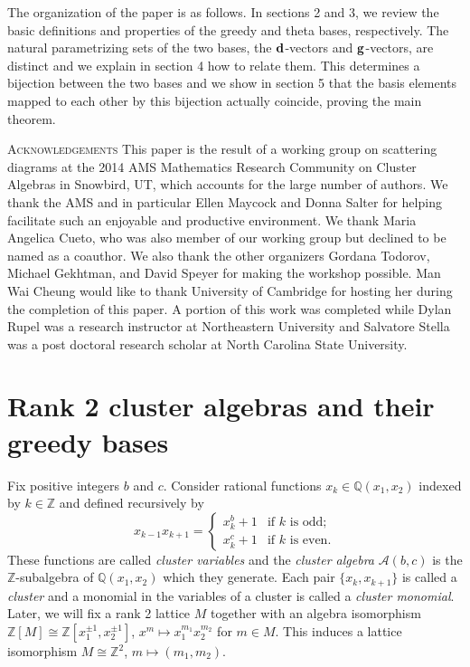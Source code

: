 \documentclass[11pt]{amsart}
\theoremstyle{remark}
\numberwithin{equation}{section}
\newcommand{\QQ}{\mathbb{Q}}
\newcommand{\ZZ}{\mathbb{Z}}
\newcommand{\cA}{\mathcal{A}}
\newcommand{\bfd}{{\bf d}}
\newcommand{\bfg}{{\bf g}}
\begin{document}
The organization of the paper is as follows.  In sections 2 and 3, we review the basic definitions and properties of the greedy and theta bases, respectively.  The natural parametrizing sets of the two bases, the $\bfd$-vectors and $\bfg$-vectors, are distinct and we explain in section 4 how to relate them.  This determines a bijection between the two bases and we show in section 5 that the basis elements mapped to each other by this bijection actually coincide, proving the main theorem.

\textsc{Acknowledgements} This paper is the result of a working group on scattering diagrams at the 2014 AMS Mathematics Research Community on Cluster Algebras in Snowbird, UT, which accounts for the large number of authors.  We thank the AMS and in particular Ellen Maycock and Donna Salter for helping facilitate such an enjoyable and productive environment.  We thank Maria Angelica Cueto, who was also member of our working group but declined to be named as a coauthor.  We also thank the other organizers Gordana Todorov, Michael Gekhtman, and David Speyer for making the workshop possible. Man Wai Cheung would like to thank University of Cambridge for hosting her during the completion of this paper.  A portion of this work was completed while Dylan Rupel was a research instructor at Northeastern University and Salvatore Stella was a post doctoral research scholar at North Carolina State University.


\section{Rank 2 cluster algebras and their greedy bases}
Fix positive integers $b$ and $c$.  Consider rational functions $x_k\in\QQ(x_1,x_2)$ indexed by $k\in\ZZ$ and defined recursively by 
\begin{equation}\label{eq:exchangerelations}
  x_{k-1}x_{k+1}=
  \begin{cases}
    x_k^b+1 & \text{if $k$ is odd;}\\
    x_k^c+1 & \text{if $k$ is even.}
  \end{cases}
\end{equation}
These functions are called \emph{cluster variables} and the \emph{cluster
algebra} $\cA(b,c)$ is the $\ZZ$-subalgebra of $\QQ(x_1,x_2)$ which they
generate.  Each pair $\{x_k, x_{k+1}\}$ is called a \emph{cluster} and a monomial in the variables of a cluster is called a \emph{cluster monomial}.  Later, we will fix a rank 2 lattice $M$ together with an algebra isomorphism $\ZZ[M] \cong \ZZ[x_1^{\pm1},x_2^{\pm1}]$, $x^m\mapsto x_1^{m_1}x_2^{m_2}$ for $m \in M$.  This induces a lattice isomorphism $M \cong \ZZ^2$, $m \mapsto (m_1,m_2)$.
\end{document}
